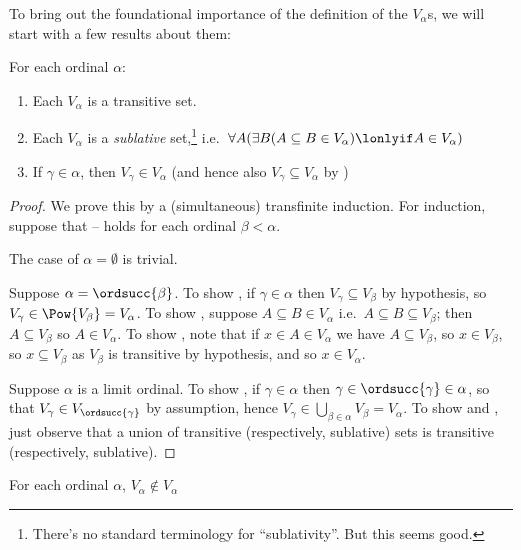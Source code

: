 \documentclass[../../../include/open-logic-section]{subfiles}
\begin{document}
To bring out the foundational importance of the definition of the $V_\alpha$s, we will start with a few results about them:
\begin{lem}For each ordinal $\alpha$:
	\begin{enumerate}
		\item{} Each $V_\alpha$ is a transitive set.
		\item{} Each $V_\alpha$ is a \emph{sublative} set,\footnote{There's no standard terminology for ``sublativity''. But this seems good.} i.e.\ $\forall A(\exists B(A \subseteq B \in V_\alpha) \lonlyif A \in V_\alpha)$
		\item{} If $\gamma \in \alpha$, then $V_\gamma \in V_\alpha$ (and hence also $V_\gamma \subseteq V_\alpha$ by )
	\end{enumerate}
\end{lem}
\begin{proof}
	We prove this by a (simultaneous) transfinite induction.  For induction, suppose that -- holds for each ordinal $\beta < \alpha$. 

	The case of $\alpha = \emptyset$ is trivial. 
	
	Suppose $\alpha = \ordsucc{\beta}$. To show , if $\gamma \in \alpha$ then $V_\gamma \subseteq V_\beta$ by hypothesis, so $V_\gamma \in \Pow{V_\beta} = V_\alpha$. To show , suppose $A \subseteq B \in V_\alpha$ i.e.\ $A \subseteq B \subseteq V_\beta$; then $A \subseteq V_\beta$ so $A \in V_\alpha$. To show , note that if $x \in A \in V_\alpha$ we have $A \subseteq V_\beta$, so $x \in V_\beta$, so $x \subseteq V_\beta$ as $V_\beta$ is transitive by hypothesis, and so $x \in V_\alpha$. 
	
	Suppose $\alpha$ is  a limit ordinal. To show , if $\gamma \in \alpha$ then $\gamma \in \ordsucc{\gamma} \in \alpha$, so that $V_\gamma \in V_{\ordsucc{\gamma}}$ by assumption, hence $V_\gamma \in \bigcup_{\beta \in \alpha} V_\beta = V_\alpha$. To show  and , just observe that a union of transitive (respectively, sublative) sets is transitive (respectively, sublative). 
\end{proof}
\begin{lem}
	For each ordinal $\alpha$, $V_\alpha \notin V_\alpha$
\end{lem}
\end{document}
